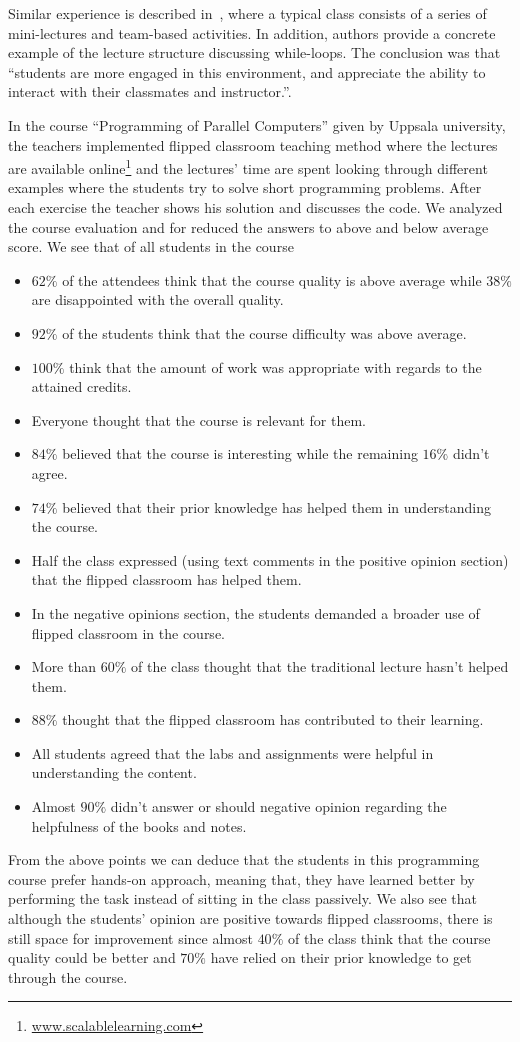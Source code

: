 \documentclass{article}
\begin{document}
Similar experience is described in~\cite{cordes2002active}, where a
typical class consists of a series of mini-lectures and team-based
activities.  In addition, authors provide a concrete example of the
lecture structure discussing while-loops. The conclusion was that
``students are more engaged in this environment, and appreciate the
ability to interact with their classmates and instructor.''.

In the course ``Programming of Parallel Computers'' given by Uppsala university,
the teachers implemented flipped classroom teaching method where the
lectures are available online\footnote{\url{www.scalablelearning.com}}
and the lectures' time are spent looking through different examples
where the students try to solve short programming problems. After each
exercise the teacher shows his solution and discusses the code. We
analyzed the course evaluation and for reduced the answers to above
and below average score. We see that of all students in the course
\begin{itemize}
	\item $62\%$ of the attendees think that the course quality is
		above average while $38\%$ are disappointed with the
		overall quality.
	\item $92\%$ of the students think that the course difficulty
		was above average.
	\item $100\%$ think that the amount of work was appropriate
		with regards to the attained credits.
	\item Everyone thought that the course is relevant for them.
	\item $84\%$ believed that the course is interesting while the
		remaining $16\%$ didn't agree.
	\item $74\%$ believed that their prior knowledge has helped
		them in understanding the course.
	\item Half the class expressed (using text comments in the
		positive opinion section) that the flipped classroom has helped them.
	\item In the negative opinions section, the students demanded
		a broader use of flipped classroom in the course.
	\item More than $60\%$ of the class thought that the
		traditional lecture hasn't helped them.
	\item $88\%$ thought that the flipped classroom has
		contributed to their learning.
	\item All students agreed that the labs and assignments were helpful in
		understanding the content.
	\item Almost $90\%$ didn't answer or should negative opinion
		regarding the helpfulness of the books and notes.
\end{itemize}
From the above points we can deduce that the students in this
programming course prefer hands-on approach, meaning that, they have
learned better by performing the task instead of sitting in the class
passively. We also see that although the students' opinion are
positive towards flipped classrooms, there is still space for
improvement since almost $40\%$ of the class think that the course
quality could be better and $70\%$ have relied on their prior
knowledge to get through the course.
\end{document}
